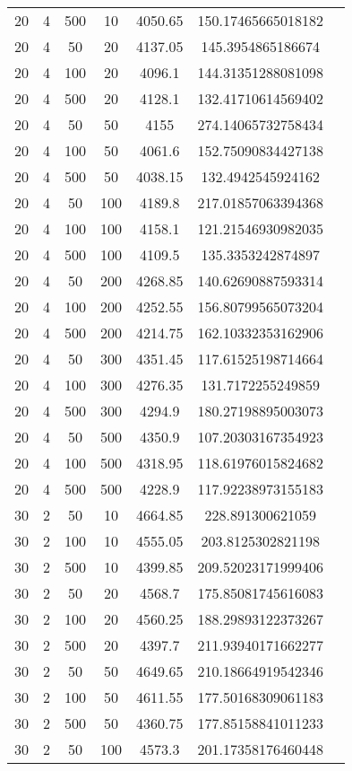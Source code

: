 {\begin{longtabu}{S
S
S
S
S
S[round-mode=places,round-precision=0]
S[round-mode=places,round-precision=0]}
20 & 4 & 500 & 10 & 4050.65 & 150.17465665018182 \\
20 & 4 & 50 & 20 & 4137.05 & 145.3954865186674 \\
20 & 4 & 100 & 20 & 4096.1 & 144.31351288081098 \\
20 & 4 & 500 & 20 & 4128.1 & 132.41710614569402 \\
20 & 4 & 50 & 50 & 4155 & 274.14065732758434 \\
20 & 4 & 100 & 50 & 4061.6 & 152.75090834427138 \\
20 & 4 & 500 & 50 & 4038.15 & 132.4942545924162 \\
20 & 4 & 50 & 100 & 4189.8 & 217.01857063394368 \\
20 & 4 & 100 & 100 & 4158.1 & 121.21546930982035 \\
20 & 4 & 500 & 100 & 4109.5 & 135.3353242874897 \\
20 & 4 & 50 & 200 & 4268.85 & 140.62690887593314 \\
20 & 4 & 100 & 200 & 4252.55 & 156.80799565073204 \\
20 & 4 & 500 & 200 & 4214.75 & 162.10332353162906 \\
20 & 4 & 50 & 300 & 4351.45 & 117.61525198714664 \\
20 & 4 & 100 & 300 & 4276.35 & 131.7172255249859 \\
20 & 4 & 500 & 300 & 4294.9 & 180.27198895003073 \\
20 & 4 & 50 & 500 & 4350.9 & 107.20303167354923 \\
20 & 4 & 100 & 500 & 4318.95 & 118.61976015824682 \\
20 & 4 & 500 & 500 & 4228.9 & 117.92238973155183 \\
30 & 2 & 50 & 10 & 4664.85 & 228.891300621059 \\
30 & 2 & 100 & 10 & 4555.05 & 203.8125302821198 \\
30 & 2 & 500 & 10 & 4399.85 & 209.52023171999406 \\
30 & 2 & 50 & 20 & 4568.7 & 175.85081745616083 \\
30 & 2 & 100 & 20 & 4560.25 & 188.29893122373267 \\
30 & 2 & 500 & 20 & 4397.7 & 211.93940171662277 \\
30 & 2 & 50 & 50 & 4649.65 & 210.18664919542346 \\
30 & 2 & 100 & 50 & 4611.55 & 177.50168309061183 \\
30 & 2 & 500 & 50 & 4360.75 & 177.85158841011233 \\
30 & 2 & 50 & 100 & 4573.3 & 201.17358176460448 \\

\end{longtabu}}
